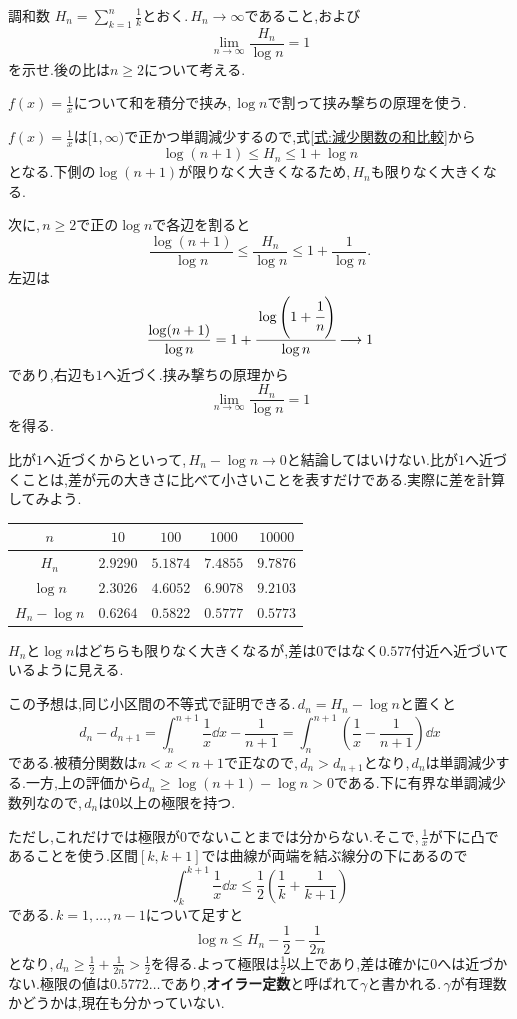 \begin{example}{調和数}
$H_n=\sum_{k=1}^{n}\frac1k$とおく.\,$H_n\to\infty$であること,および
\[
 \lim_{n\to\infty}\frac{H_n}{\log n}=1
\]
を示せ.後の比は$n\ge2$について考える.
\end{example}

$f(x)=\frac1x$について和を積分で挟み,\,$\log n$で割って挟み撃ちの原理を使う.

$f(x)=\frac1x$は$[1,\infty)$で正かつ単調減少するので,式\eqref{式:減少関数の和比較}から
\[
 \log(n+1)\le H_n\le1+\log n
\]
となる.下側の$\log(n+1)$が限りなく大きくなるため,\,$H_n$も限りなく大きくなる.

次に,\,$n\ge2$で正の$\log n$で各辺を割ると
\[
 \frac{\log(n+1)}{\log n}
 \le\frac{H_n}{\log n}
 \le1+\frac1{\log n}.
\]
左辺は
\[
 \frac{\log(n+1)}{\log n}
 =1+\cfrac{\log\left(1+\cfrac1n\right)}{\log n}
 \longrightarrow1
\]
であり,右辺も$1$へ近づく.挟み撃ちの原理から
\[
 \lim_{n\to\infty}\frac{H_n}{\log n}=1
\]
を得る.

比が$1$へ近づくからといって,\,$H_n-\log n\to0$と結論してはいけない.比が$1$へ近づくことは,差が元の大きさに比べて小さいことを表すだけである.実際に差を計算してみよう.
\begin{center}
\begin{tabular}{ccccc}
\toprule
$n$ & $10$ & $100$ & $1000$ & $10000$\\
\midrule
$H_n$ & $2.9290$ & $5.1874$ & $7.4855$ & $9.7876$\\
$\log n$ & $2.3026$ & $4.6052$ & $6.9078$ & $9.2103$\\
$H_n-\log n$ & $0.6264$ & $0.5822$ & $0.5777$ & $0.5773$\\
\bottomrule
\end{tabular}
\end{center}
$H_n$と$\log n$はどちらも限りなく大きくなるが,差は$0$ではなく$0.577$付近へ近づいているように見える.

この予想は,同じ小区間の不等式で証明できる.\,$d_n=H_n-\log n$と置くと
\[
 d_n-d_{n+1}
 =\int_n^{n+1}\frac1x\dd x-\frac1{n+1}
 =\int_n^{n+1}\left(\frac1x-\frac1{n+1}\right)\dd x
\]
である.被積分関数は$n<x<n+1$で正なので,\,$d_n>d_{n+1}$となり,\,$d_n$は単調減少する.一方,上の評価から$d_n\ge\log(n+1)-\log n>0$である.下に有界な単調減少数列なので,\,$d_n$は$0$以上の極限を持つ.

ただし,これだけでは極限が$0$でないことまでは分からない.そこで,\,$\frac1x$が下に凸であることを使う.区間$[k,k+1]$では曲線が両端を結ぶ線分の下にあるので
\[
 \int_k^{k+1}\frac1x\dd x\le\frac12\left(\frac1k+\frac1{k+1}\right)
\]
である.\,$k=1,\ldots,n-1$について足すと
\[
 \log n\le H_n-\frac12-\frac1{2n}
\]
となり,\,$d_n\ge\frac12+\frac1{2n}>\frac12$を得る.よって極限は$\frac12$以上であり,差は確かに$0$へは近づかない.極限の値は$0.5772\ldots$であり,\textbf{オイラー定数}と呼ばれて$\gamma$と書かれる.\,$\gamma$が有理数かどうかは,現在も分かっていない.
